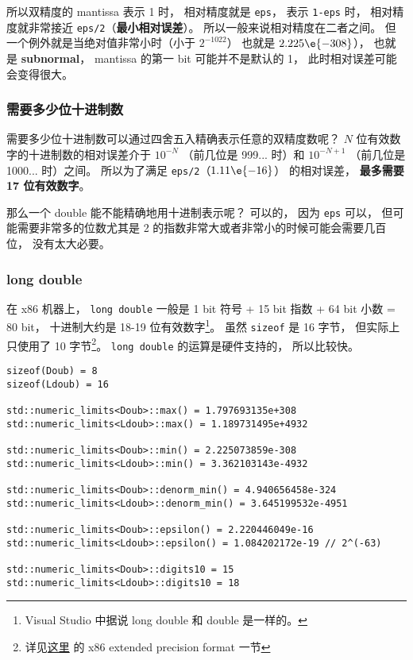 所以双精度的 mantissa 表示 1 时， 相对精度就是 \verb|eps|， 表示 \verb|1-eps| 时， 相对精度就非常接近 \verb|eps/2|（\textbf{最小相对误差}）。 所以一般来说相对精度在二者之间。 但一个例外就是当绝对值非常小时（小于 $2^{-1022}$） 也就是 $2.225\e{-308}$）， 也就是 \textbf{subnormal}， mantissa 的第一 bit 可能并不是默认的 1， 此时相对误差可能会变得很大。

\subsubsection{需要多少位十进制数}
需要多少位十进制数可以通过四舍五入精确表示任意的双精度数呢？ $N$ 位有效数字的十进制数的相对误差介于 $10^{-N}$ （前几位是 999... 时）和 $10^{-N+1}$ （前几位是 1000... 时）之间。 所以为了满足 \verb|eps/2|（$1.11\e{-16}$） 的相对误差， \textbf{最多需要 17 位有效数字}。

那么一个 double 能不能精确地用十进制表示呢？ 可以的， 因为 \verb|eps| 可以， 但可能需要非常多的位数尤其是 2 的指数非常大或者非常小的时候可能会需要几百位， 没有太大必要。

\subsubsection{long double}
在 x86 机器上， \verb|long double| 一般是 1 bit 符号 + 15 bit 指数 + 64 bit 小数 = 80 bit， 十进制大约是 18-19 位有效数字\footnote{Visual Studio 中据说 long double 和 double 是一样的。}。 虽然 \verb|sizeof| 是 16 字节， 但实际上只使用了 10 字节\footnote{详见\href{https://en.wikipedia.org/wiki/Extended_precision}{这里} 的 x86 extended precision format 一节}。 \verb|long double| 的运算是硬件支持的， 所以比较快。

\begin{lstlisting}[language=none]
sizeof(Doub) = 8
sizeof(Ldoub) = 16

std::numeric_limits<Doub>::max() = 1.797693135e+308
std::numeric_limits<Ldoub>::max() = 1.189731495e+4932

std::numeric_limits<Doub>::min() = 2.225073859e-308
std::numeric_limits<Ldoub>::min() = 3.362103143e-4932

std::numeric_limits<Doub>::denorm_min() = 4.940656458e-324
std::numeric_limits<Ldoub>::denorm_min() = 3.645199532e-4951

std::numeric_limits<Doub>::epsilon() = 2.220446049e-16
std::numeric_limits<Ldoub>::epsilon() = 1.084202172e-19 // 2^(-63)

std::numeric_limits<Doub>::digits10 = 15
std::numeric_limits<Ldoub>::digits10 = 18
\end{lstlisting}

